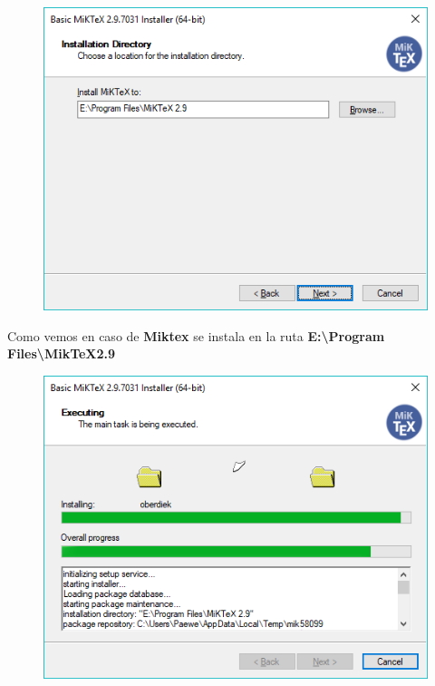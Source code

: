 \documentclass{article}
\begin{document}
\begin{figure}[h!]
  \centering
  \includegraphics[scale=0.75]{./imagenes/Install_Miktex4.png}
\end{figure}

Como vemos en caso de \textbf{Miktex} se instala en la ruta
\textbf{E:{\textbackslash}Program Files{\textbackslash}MikTeX2.9}

\begin{figure}[h!]
  \centering
  \includegraphics[scale=0.75]{./imagenes/Install_Miktex5.png}
\end{figure}
\end{document}
